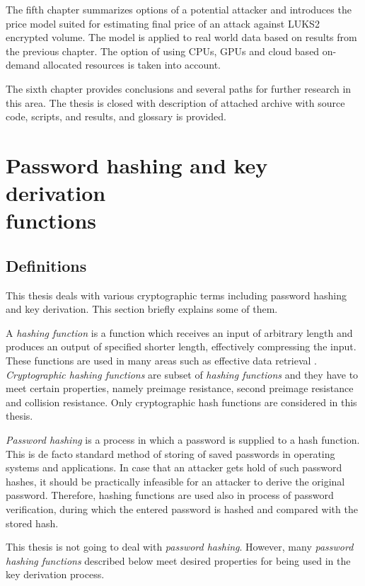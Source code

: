 \documentclass[nolof,digital]{fithesis3}
\begin{document}
The fifth chapter summarizes options of a potential attacker and introduces the price model suited for estimating final price of an attack against LUKS2 encrypted volume. The model is applied to real world data based on results from the previous chapter. The option of using CPUs, GPUs and cloud based on-demand allocated resources is taken into account.

The sixth chapter provides conclusions and several paths for further research in this area. The thesis is closed with description of attached archive with source code, scripts, and results, and glossary is provided.

\chapter[Password hashing and key derivation functions]{Password hashing and key derivation\\functions}

\section{Definitions}
\label{definitions}
This thesis deals with various cryptographic terms including password hashing and key derivation. This section briefly explains some of them.

A \emph{hashing function} is a function which receives an input of arbitrary length and produces an output of specified shorter length, effectively compressing the input. These functions are used in many areas such as effective data retrieval \parencite{itmc14}. \emph{Cryptographic hashing functions} are subset of \emph{hashing functions} and they have to meet certain properties, namely preimage resistance, second preimage resistance and collision resistance. Only cryptographic hash functions are considered in this thesis.

\emph{Password hashing} is a process in which a password is supplied to a hash function. This is de facto standard method of storing of saved passwords in operating systems and applications. In case that an attacker gets hold of such password hashes, it should be practically infeasible for an attacker to derive the original password. Therefore, hashing functions are used also in process of password verification, during which the entered password is hashed and compared with the stored hash.

This thesis is not going to deal with \emph{password hashing}. However, many \emph{password hashing functions} described below meet desired properties for being used in the key derivation process.
\end{document}
